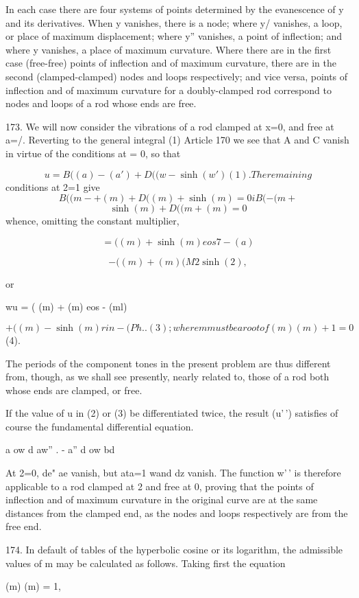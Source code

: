 In each case there are four systems of points determined by the
evanescence of y and its derivatives. When y vanishes, there is a node;
where y/ vanishes, a loop, or place of maximum displacement; where y''
vanishes, a point of inflection; and where y vanishes, a place of
maximum curvature. Where there are in the first case (free-free) points
of inflection and of maximum curvature, there are in the second
(clamped-clamped) nodes and loops respectively; and vice versa, points
of inflection and of maximum curvature for a doubly-clamped rod
correspond to nodes and loops of a rod whose ends are free.

173. We will now consider the vibrations of a rod clamped at x=0, and
free at a=/. Reverting to the general integral (1) Article 170 we see
that A and C vanish in virtue of the conditions at = 0, so that

\[ u = B ( (a) - (a') + D ( (w - \sinh(w') (1). The remaining \]
conditions at 2=1 give
\[ B( (m-+ (m) + D ( (m) + \sinh(m) = 0 i B( - (m + \]
\[ \sinh(m) + D ( (m+ (m) = 0 \]
whence, omitting the constant multiplier,

\[ = ( (m) + \sinh(m) eos 7 - (a) \]

\[ - ( (m) + (m) (M2 \sinh(2), \]

or

wu = ( (m) + (m) eos - (ml)

\[ + ( (m) - \sinh(m) rin - (Ph .. (3); where m must be a root of (m) (m) + 1=0 \]
(4).

The periods of the component tones in the present problem are thus
different from, though, as we shall see presently, nearly related to,
those of a rod both whose ends are clamped, or free.

If the value of u in (2) or (3) be differentiated twice, the result
(u'\,') satisfies of course the fundamental differential equation.

a ow d aw'' . - a'' d ow bd

At 2=0, de" ae vanish, but ata=1 wand dz vanish. The function w'\,' is
therefore applicable to a rod clamped at 2 and free at 0, proving that
the points of inflection and of maximum curvature in the original curve
are at the same distances from the clamped end, as the nodes and loops
respectively are from the free end.

174. In default of tables of the hyperbolic cosine or its logarithm, the
admissible values of m may be calculated as follows. Taking first the
equation

(m) (m) = 1,

